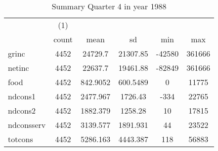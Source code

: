 \begin{table}[htbp]\centering
\def\sym#1{\ifmmode^{#1}\else\(^{#1}\)\fi}
\caption{Summary Quarter 4 in year 1988 \label{sum\_Q4\_y1988}}
\begin{tabular}{l*{1}{ccccc}}
\hline\hline
            &\multicolumn{1}{c}{(1)}&            &            &            &            \\
            &       count&        mean&          sd&         min&         max\\
\hline
grinc       &        4452&     24729.7&    21307.85&      -42580&      361666\\
netinc      &        4452&     22637.7&    19461.88&      -82849&      361666\\
food        &        4452&    842.9052&    600.5489&           0&       11775\\
ndcons1     &        4452&    2477.967&     1726.43&        -334&       22765\\
ndcons2     &        4452&    1882.379&     1258.28&          10&       17815\\
ndconsserv  &        4452&    3139.577&    1891.931&          44&       23522\\
totcons     &        4452&    5286.163&    4443.387&         118&       56883\\
\hline\hline
\end{tabular}
\end{table}
